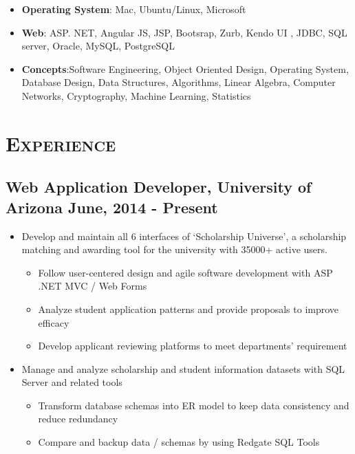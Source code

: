 \documentclass[11.7pt,letterpaper]{article}
\begin{document}
\begin{minipage}{\textwidth}
\begin{itemize}
	\item {\bfseries Operating System}: Mac, Ubuntu/Linux, Microsoft
	\item {\bfseries Web}: ASP. NET, Angular JS, JSP, Bootsrap, Zurb, Kendo UI , JDBC, SQL server, Oracle, MySQL, PostgreSQL
	\item {\bfseries Concepts}:Software Engineering,  Object Oriented Design, Operating System, Database Design, Data Structures, Algorithms, Linear Algebra, Computer Networks, Cryptography, Machine Learning, Statistics
 
\end{itemize}



\vspace{-1mm}
\section{\scshape Experience}
\vspace{-2mm}

\subsection{Web Application Developer, University of Arizona \hfill June, 2014 - Present} 
\begin{itemize}
	\item Develop and maintain all 6 interfaces of `Scholarship Universe', a scholarship matching and awarding tool for the university with 35000+ active users.
	\begin{itemize}
		\item Follow user-centered design and agile software development with ASP .NET MVC / Web Forms
		\item Analyze student application patterns and provide proposals to improve efficacy
		\item Develop applicant reviewing platforms to meet departments' requirement 
	\end{itemize}
	\vspace{1mm}
	\item Manage and analyze scholarship and student information datasets with SQL Server and related tools 
	\begin{itemize}
		\item Transform database schemas into ER model to keep data consistency and reduce redundancy 
		\item Compare and backup data / schemas by using Redgate SQL Tools
	\end{itemize}
\end{itemize}



\end{minipage}
\end{document}
